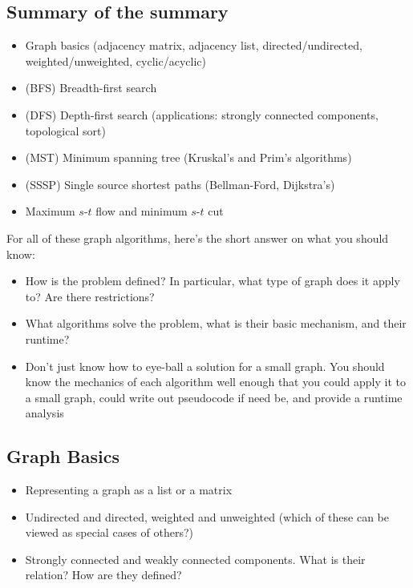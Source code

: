 \documentclass[11  pt]{exam}
\begin{document}
	\subsection{Summary of the summary}
	\begin{itemize}
		\item Graph basics (adjacency matrix, adjacency list, directed/undirected, weighted/unweighted, cyclic/acyclic)
		\item (BFS) Breadth-first search
		\item (DFS) Depth-first search (applications: strongly connected components, topological sort)
		\item (MST) Minimum spanning tree (Kruskal's and Prim's algorithms)
		\item (SSSP) Single source shortest paths (Bellman-Ford, Dijkstra's)
		\item Maximum $s$-$t$ flow and minimum $s$-$t$ cut
	\end{itemize}

For all of these graph algorithms, here's the short answer on what you should know:

\begin{itemize}
	\item How is the problem defined? In particular, what type of graph does it apply to? Are there restrictions?
	\item What algorithms solve the problem, what is their basic mechanism, and their runtime?
	\item Don't just know how to eye-ball a solution for a small graph. You should know the mechanics of each algorithm well enough that you could apply it to a small graph, could write out pseudocode if need be, and provide a runtime analysis 
\end{itemize}
	
\subsection{Graph Basics}
	
	\begin{itemize}
		\item Representing a graph as a list or a matrix
		\item Undirected and directed, weighted and unweighted (which of these can be viewed as special cases of others?)
		\item Strongly connected and weakly connected components. What is their relation? How are they defined?
	\end{itemize}
\end{document}
